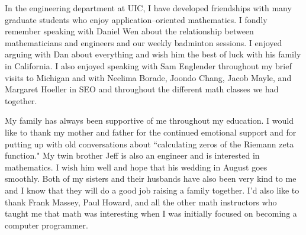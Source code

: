 In the engineering department at UIC, I have developed friendships with many graduate students who enjoy application--oriented mathematics. I fondly remember speaking with Daniel Wen about the relationship between mathematicians and engineers and our weekly badminton sessions. I enjoyed arguing with Dan about everything and wish him the best of luck with his family in California. I also enjoyed speaking with Sam Englender throughout my brief visits to Michigan and with Neelima Borade, Joondo Chang, Jacob Mayle, and Margaret Hoeller in SEO and throughout the different math classes we had together.

My family has always been supportive of me throughout my education. I would like to thank my mother and father for the continued emotional support and for putting up with old conversations about ``calculating zeros of the Riemann zeta function." My twin brother Jeff is also an engineer and is interested in mathematics. I wish him well and hope that his wedding in August goes smoothly. Both of my sisters and their husbands have also been very kind to me and I know that they will do a good job raising a family together. I'd also like to thank Frank Massey, Paul Howard, and all the other math instructors who taught me that math was interesting when I was initially focused on becoming a computer programmer.

\thispagestyle{pageonbottom}
